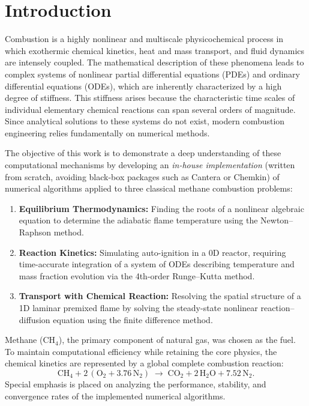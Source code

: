\documentclass[11pt,a4paper]{article}
\begin{document}
\tableofcontents
\newpage

\section{Introduction}
Combustion is a highly nonlinear and multiscale physicochemical process in which exothermic chemical
kinetics, heat and mass transport, and fluid dynamics are intensely coupled. The mathematical
description of these phenomena leads to complex systems of nonlinear partial differential equations
(PDEs) and ordinary differential equations (ODEs), which are inherently characterized by a high
degree of stiffness. This stiffness arises because the characteristic time scales of individual
elementary chemical reactions can span several orders of magnitude. Since analytical solutions to
these systems do not exist, modern combustion engineering relies fundamentally on numerical methods.

The objective of this work is to demonstrate a deep understanding of these computational mechanisms
by developing an \emph{in-house implementation} (written from scratch, avoiding black-box packages
such as Cantera or Chemkin) of numerical algorithms applied to three classical methane combustion problems:
\begin{enumerate}
  \item \textbf{Equilibrium Thermodynamics:} Finding the roots of a nonlinear algebraic equation
        to determine the adiabatic flame temperature using the Newton--Raphson method.
  \item \textbf{Reaction Kinetics:} Simulating auto-ignition in a 0D reactor, requiring time-accurate
        integration of a system of ODEs describing temperature and mass fraction evolution via the
        4th-order Runge--Kutta method.
  \item \textbf{Transport with Chemical Reaction:} Resolving the spatial structure of a 1D laminar
        premixed flame by solving the steady-state nonlinear reaction--diffusion equation using the
        finite difference method.
\end{enumerate}

Methane ($\mathrm{CH_4}$), the primary component of natural gas, was chosen as the fuel. To maintain
computational efficiency while retaining the core physics, the chemical kinetics are represented
by a global complete combustion reaction:
\begin{equation}
  \mathrm{CH_4} + 2\,(\mathrm{O_2} + 3.76\,\mathrm{N_2})
  \;\longrightarrow\;
  \mathrm{CO_2} + 2\,\mathrm{H_2O} + 7.52\,\mathrm{N_2}.
  \label{eq:global}
\end{equation}
Special emphasis is placed on analyzing the performance, stability, and convergence rates of the
implemented numerical algorithms.
\end{document}
